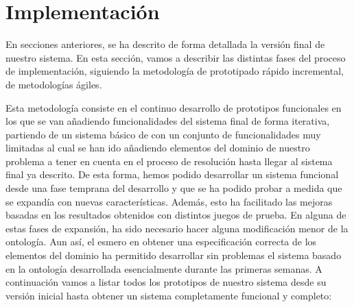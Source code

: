 \documentclass{article}
\begin{document}
\newpage
\section{Implementación}
En secciones anteriores, se ha descrito de forma detallada la versión final de nuestro sistema. En esta sección, vamos a describir las distintas fases del proceso de implementación, siguiendo la metodología de prototipado rápido incremental, de metodologías ágiles.
\par
Esta metodología consiste en el continuo desarrollo de prototipos funcionales en los que se van añadiendo funcionalidades del sistema final de forma iterativa, partiendo de un sistema básico de con un conjunto de funcionalidades muy limitadas al cual se han ido añadiendo elementos del dominio de nuestro problema a tener en cuenta en el proceso de resolución hasta llegar al sistema final ya descrito. De esta forma, hemos podido desarrollar un sistema funcional desde una fase temprana del desarrollo y que se ha podido probar a medida que se expandía con nuevas características. Además, esto ha facilitado las mejoras basadas en los resultados obtenidos con distintos juegos de prueba. En alguna de estas fases de expansión, ha sido necesario hacer alguna modificación menor de la ontología. Aun así, el esmero en obtener una especificación correcta de los elementos del dominio ha permitido desarrollar sin problemas el sistema basado en la ontología desarrollada esencialmente durante las primeras semanas. A continuación vamos a listar todos los prototipos de nuestro sistema desde su versión inicial hasta obtener un sistema completamente funcional y completo:
\end{document}
